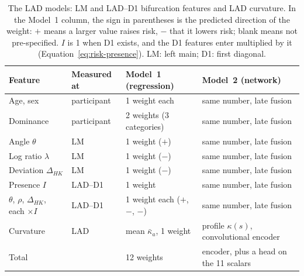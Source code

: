 \begin{table}[tbp]
  \centering
  \small
  \newcommand{\fused}{same number, late fusion}
  \caption{The LAD models: LM and LAD--D1 bifurcation features and LAD curvature.
    In the Model~1 column, the sign in parentheses is the predicted direction of the weight: $+$ means a larger value raises risk, $-$ that it lowers risk; blank means not pre-specified.
    $I$ is 1 when D1 exists, and the D1 features enter multiplied by it (Equation~\ref{eq:risk-presence}).
    LM: left main; D1: first diagonal.}
  \label{tab:risk-lad}
  \begin{tabular}{@{}p{3.3cm}p{1.9cm}p{4.0cm}p{5.0cm}@{}}
    \toprule
    Feature & Measured at & Model~1 (regression) & Model~2 (network) \\
    \midrule
    Age, sex & participant & 1 weight each & \fused \\
    Dominance & participant & 2 weights (3 categories) & \fused \\
    Angle $\theta$ & LM & 1 weight ($+$) & \fused \\
    Log ratio $\lambda$ & LM & 1 weight ($-$) & \fused \\
    Deviation $\Delta_{HK}$ & LM & 1 weight ($-$) & \fused \\
    Presence $I$ & LAD--D1 & 1 weight & \fused \\
    $\theta$, $\rho$, $\Delta_{HK}$, each $\times I$ & LAD--D1 & 1 weight each ($+$, $-$, $-$) & \fused \\
    Curvature & LAD & mean $\bar\kappa_a$, 1 weight & profile $\kappa(s)$, convolutional encoder \\
    \midrule
    Total & & 12 weights & encoder, plus a head on the 11 scalars \\
    \bottomrule
  \end{tabular}


\end{table}
